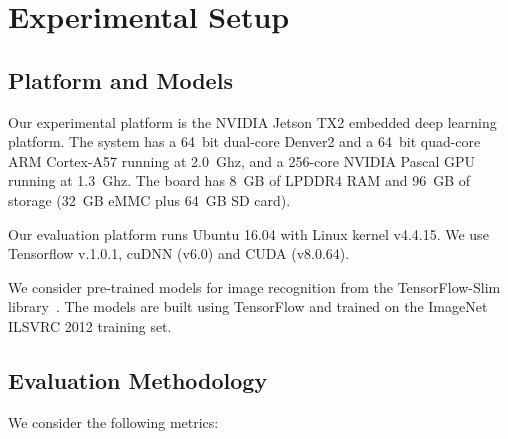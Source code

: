 \section{Experimental Setup \label{sec:setup}}
\subsection{Platform and Models}
 Our experimental platform is the NVIDIA Jetson TX2 embedded deep learning platform. The system has a 64~bit
dual-core Denver2 and a 64~bit quad-core ARM Cortex-A57 running at 2.0~Ghz, and a 256-core NVIDIA Pascal GPU running at 1.3~Ghz. The board
has 8~GB of LPDDR4 RAM and 96~GB of storage (32~GB eMMC plus 64~GB SD card).


 Our evaluation platform runs Ubuntu 16.04 with Linux kernel v4.4.15. We use Tensorflow v.1.0.1, cuDNN (v6.0)
and CUDA (v8.0.64).


 We consider  pre-trained \CNN models for image recognition from the TensorFlow-Slim
library~\cite{silberman2013tensorflow}. The models are built using TensorFlow and trained on the ImageNet ILSVRC 2012 training set.


\subsection{Evaluation Methodology \label{sec:method}}


 We consider the following metrics:

